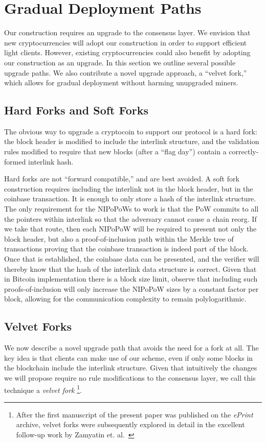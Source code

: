 \section{Gradual Deployment Paths}

\label{sec.forks}
Our construction requires an upgrade to the consensus layer. We envision that
new cryptocurrencies will adopt our construction in order to support efficient
light clients. However, existing cryptocurrencies could also benefit by adopting
our construction as an upgrade. In this section we outline several possible
upgrade paths. We also contribute a novel upgrade approach, a ``velvet fork,''
which allows for gradual deployment without harming unupgraded miners.

\subsection{Hard Forks and Soft Forks}
The obvious way to upgrade a cryptocoin to support our protocol is a hard fork:
the block header is modified to include the interlink structure, and the
validation rules modified to require that new blocks (after a ``flag day'')
contain a correctly-formed interlink hash.

Hard forks are not ``forward compatible,'' and are best avoided. A soft fork
construction requires including the interlink not in the block
header, but in the coinbase transaction. It is enough to only store a hash of
the interlink structure. The only requirement for the NIPoPoWs to work is that the
PoW commits to all the pointers within interlink so that the adversary cannot
cause a chain reorg. If we take that route, then each NIPoPoW will be required to
present not only the block header, but also a proof-of-inclusion path within the
Merkle tree of transactions proving that the coinbase transaction is indeed part
of the block. Once that is established, the coinbase data can be presented, and
the verifier will thereby know that the hash of the interlink data structure is
correct. Given that in Bitcoin implementation there is a block size limit,
observe that including such proofs-of-inclusion will only increase the NIPoPoW
sizes by a constant factor per block, allowing for the communication complexity
to remain polylogarithmic.

\subsection{Velvet Forks}
We now describe a novel upgrade path that avoids the need for a fork at all. The
key idea is that clients can make use of our scheme, even if only some blocks in
the blockchain include the interlink structure. Given that intuitively the
changes we will propose require no rule modifications to the consensus layer, we call this
technique a \textit{velvet fork}
\footnote{After the first manuscript of the present paper was published on the
\textit{ePrint} archive, velvet forks were subsequently explored in detail in
the excellent follow-up work by Zamyatin et. al.~\cite{velvet}}.

